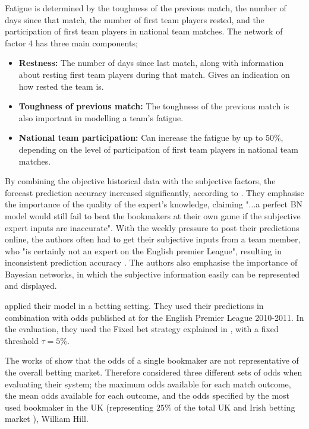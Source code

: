 Fatigue is determined by the toughness of the previous match, the number of days since that match, the number of first team players rested, and the participation of first team players in national team matches. The network of factor 4 has three main components;
\begin{itemize}
    \item \textbf{Restness:} The number of days since last match, along with information about resting first team players during that match. Gives an indication on how rested the team is.
    \item \textbf{Toughness of previous match:} The toughness of the previous match is also important in modelling a team's fatigue.
    \item \textbf{National team participation:} Can increase the fatigue by up to 50\%, depending on the level of participation of first team players in national team matches.
\end{itemize}

By combining the objective historical data with the subjective factors, the forecast prediction accuracy increased significantly, according to \citet{bib:constantinou-fenton-neil-2012}. They emphasise the importance of the quality of the expert's knowledge, claiming "...a perfect BN model would still fail to beat the bookmakers at their own game if the subjective expert inputs are inaccurate". With the weekly pressure to post their predictions online, the authors often had to get their subjective inputs from a team member, who "is certainly not an expert on the English premier League", resulting in inconsistent prediction accuracy \citep{bib:constantinou-fenton-neil-2012}. The authors also emphasise the importance of Bayesian networks, in which the subjective information easily can be represented and displayed.

\citet{bib:constantinou-fenton-neil-2012} applied their model in a betting setting. They used their predictions in combination with odds published at \citet{bib:football-data} for the English Premier League 2010-2011. In the evaluation, they used the Fixed bet strategy explained in , with a fixed threshold $\tau = 5\%$. 

The works of \citet{bib:constantinou-fenton-2013} show that the odds of a single bookmaker are not representative of the overall betting market. Therefore \citet{bib:constantinou-fenton-neil-2012} considered three different sets of odds when evaluating their system; the maximum odds available for each match outcome, the mean odds available for each outcome, and the odds specified by the most used bookmaker in the UK (representing $25\%$ of the total UK and Irish betting market \citep{bib:constantinou-fenton-neil-2012}), William Hill.

